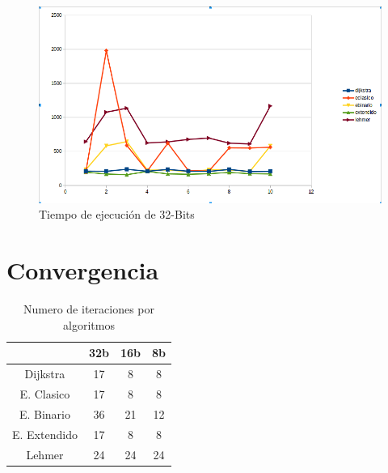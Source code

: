 \begin{figure}[H]
 \centering
 \includegraphics[scale=0.4]{pictures/32bits.png}
 \caption{Tiempo de ejecución de 32-Bits}
 \label{fig:1}
\end{figure}



\section{Convergencia}

\begin{table}[H]
\label{tablax}
\begin{center}
\begin{tabular}{|c|c|c|c|}
\hline 
 &32b&16b&8b \\
\hline
Dijkstra& 17 & 8 & 8 \\ \hline
E. Clasico& 17& 8 & 8 \\ \hline
E. Binario& 36 & 21 & 12 \\ \hline
E. Extendido& 17 & 8 & 8 \\ \hline
Lehmer& 24 & 24 & 24 \\ \hline
\end{tabular}
\end{center}
\caption{Numero de iteraciones por algoritmos}
\end{table}

